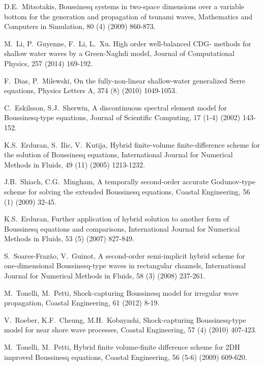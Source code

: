 \documentclass[preprint,sort&compress,1p]{article}
\begin{document}
\begin{thebibliography}{99}
 D.E.~Mitsotakis, Boussinesq systems in two-space dimensions over a variable bottom for the generation and propagation of tsunami waves, Mathematics and Computers in Simulation, 80 (4) (2009) 860-873.

 M.~Li, P.~Guyenne, F.~Li, L.~Xu. High order well-balanced CDG- methods for shallow water waves by a Green-Naghdi model, Journal of Computational Physics, 257 (2014) 169-192.

 F.~Dias, P.~Milewski, On the fully-non-linear shallow-water generalized Serre equations, Physics Letters A, 374 (8) (2010) 1049-1053.

 C.~Eskilsson, S.J.~Sherwin, A discontinuous spectral element model for Boussinesq-type equations, Journal of Scientific Computing, 17 (1-4) (2002) 143-152.

 K.S.~Erduran, S.~Ilic, V.~Kutija, Hybrid finite-volume finite-difference scheme for the solution of Boussinesq equations, International Journal for Numerical Methods in Fluids, 49 (11) (2005) 1213-1232.

 J.B.~Shiach, C.G.~Mingham, A temporally second-order accurate Godunov-type scheme for solving the extended Boussinesq equations, Coastal Engineering, 56 (1) (2009) 32-45.

 K.S.~Erduran, Further application of hybrid solution to another form of Boussinesq equations and comparisons, International Journal for Numerical Methods in Fluids, 53 (5) (2007) 827-849.

 S.~Soares-Fraz\~{a}o, V.~Guinot, A second-order semi-implicit hybrid scheme for one-dimensional Boussinesq-type waves in rectangular channels, International Journal for Numerical Methods in Fluids, 58 (3) (2008) 237-261.

 M.~Tonelli, M.~Petti, Shock-capturing Boussinesq model for irregular wave propagation, Coastal Engineering, 61 (2012) 8-19.

 V.~Roeber, K.F.~Cheung, M.H.~Kobayashi, Shock-capturing Boussinesq-type model for near shore wave processes, Coastal Engineering, 57 (4) (2010) 407-423.

 M.~Tonelli, M.~Petti, Hybrid finite volume-finite difference scheme for 2DH improved Boussinesq equations, Coastal Engineering, 56 (5-6) (2009) 609-620.


\end{thebibliography}
\end{document}
